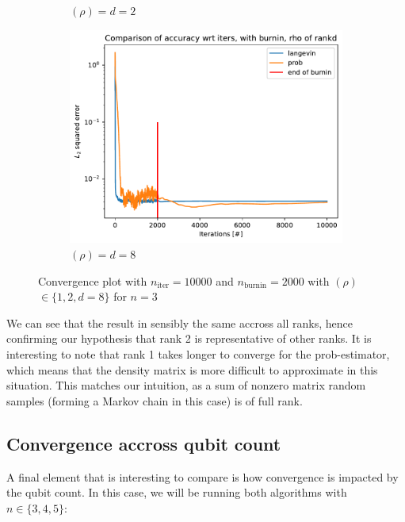 \documentclass[12pt]{memoir}
\newcommand{\nitern}[1]{$n_{\text{iter}}=#1$}
\newcommand{\nburninn}[1]{$n_{\text{burnin}}=#1$}
\newcommand{\rhorankn}[1]{\text{rank}$(\rho)=#1$}
\newcommand{\rhorank}[0]{\text{rank}$(\rho) $ }
\begin{document}
\begin{figure}[H]
\begin{subfigure}[b]{0.49\textwidth}
        \caption{\rhorankn{d=2}}
        \label{fig:conv-plot-diff-rank-2-sub}
    \end{subfigure}
    \begin{subfigure}[b]{0.49\textwidth}
        \centering
        \includegraphics[width=\textwidth]{figures/experiments/baseline/diff_rank/iters_acc_comp_iters_no_avg_rankd-1.png}
        \caption{\rhorankn{d=8}}
        \label{fig:conv-plot-diff-rank-d-sub}
    \end{subfigure}
    \caption{Convergence plot with \nitern{10000} and \nburninn{2000} with \rhorank $\in \{1,2,d=8\}$ for $n=3$  }
    \label{fig:conv-plot-diff-rank}
\end{figure}

We can see that the result in sensibly the same accross all ranks, hence confirming our hypothesis that rank 2 is representative of other ranks. It is interesting to note that rank 1 takes longer to converge for the prob-estimator, which means that the density matrix is more difficult to approximate in this situation. This matches our intuition, as a sum of nonzero matrix random samples (forming a Markov chain in this case) is of full rank.

\subsection*{Convergence accross qubit count}

A final element that is interesting to compare is how convergence is impacted by the qubit count. In this case, we will be running both algorithms with $n\in\{3,4,5\}$:
\end{document}
